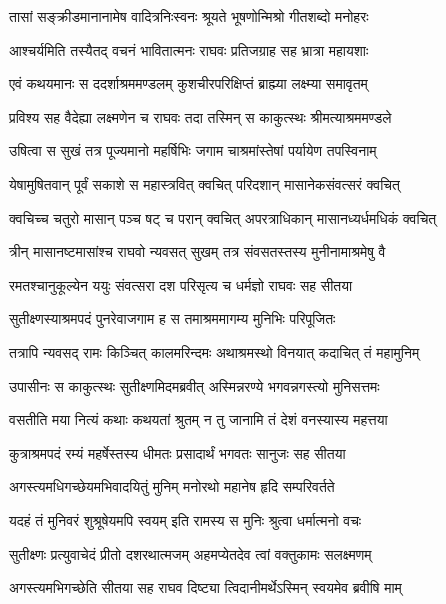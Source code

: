 \twolineshloka
{तासां सङ्क्रीडमानानामेष वादित्रनिःस्वनः}
{श्रूयते भूषणोन्मिश्रो गीतशब्दो मनोहरः} %

\twolineshloka
{आश्चर्यमिति तस्यैतद् वचनं भावितात्मनः}
{राघवः प्रतिजग्राह सह भ्रात्रा महायशाः} %

\twolineshloka
{एवं कथयमानः स ददर्शाश्रममण्डलम्}
{कुशचीरपरिक्षिप्तं ब्राह्म्या लक्ष्म्या समावृतम्} %

\twolineshloka
{प्रविश्य सह वैदेह्या लक्ष्मणेन च राघवः}
{तदा तस्मिन् स काकुत्स्थः श्रीमत्याश्रममण्डले} %

\twolineshloka
{उषित्वा स सुखं तत्र पूज्यमानो महर्षिभिः}
{जगाम चाश्रमांस्तेषां पर्यायेण तपस्विनाम्} %

\twolineshloka
{येषामुषितवान् पूर्वं सकाशे स महास्त्रवित्}
{क्वचित् परिदशान् मासानेकसंवत्सरं क्वचित्} %

\twolineshloka
{क्वचिच्च चतुरो मासान् पञ्च षट् च परान् क्वचित्}
{अपरत्राधिकान् मासानध्यर्धमधिकं क्वचित्} %

\twolineshloka
{त्रीन् मासानष्टमासांश्च राघवो न्यवसत् सुखम्}
{तत्र संवसतस्तस्य मुनीनामाश्रमेषु वै} %

\twolineshloka
{रमतश्चानुकूल्येन ययुः संवत्सरा दश}
{परिसृत्य च धर्मज्ञो राघवः सह सीतया} %

\twolineshloka
{सुतीक्ष्णस्याश्रमपदं पुनरेवाजगाम ह}
{स तमाश्रममागम्य मुनिभिः परिपूजितः} %

\twolineshloka
{तत्रापि न्यवसद् रामः किञ्चित् कालमरिन्दमः}
{अथाश्रमस्थो विनयात् कदाचित् तं महामुनिम्} %

\twolineshloka
{उपासीनः स काकुत्स्थः सुतीक्ष्णमिदमब्रवीत्}
{अस्मिन्नरण्ये भगवन्नगस्त्यो मुनिसत्तमः} %

\twolineshloka
{वसतीति मया नित्यं कथाः कथयतां श्रुतम्}
{न तु जानामि तं देशं वनस्यास्य महत्तया} %

\twolineshloka
{कुत्राश्रमपदं रम्यं महर्षेस्तस्य धीमतः}
{प्रसादार्थं भगवतः सानुजः सह सीतया} %

\twolineshloka
{अगस्त्यमधिगच्छेयमभिवादयितुं मुनिम्}
{मनोरथो महानेष हृदि सम्परिवर्तते} %

\twolineshloka
{यदहं तं मुनिवरं शुश्रूषेयमपि स्वयम्}
{इति रामस्य स मुनिः श्रुत्वा धर्मात्मनो वचः} %

\twolineshloka
{सुतीक्ष्णः प्रत्युवाचेदं प्रीतो दशरथात्मजम्}
{अहमप्येतदेव त्वां वक्तुकामः सलक्ष्मणम्} %

\twolineshloka
{अगस्त्यमभिगच्छेति सीतया सह राघव}
{दिष्ट्या त्विदानीमर्थेऽस्मिन् स्वयमेव ब्रवीषि माम्} %

